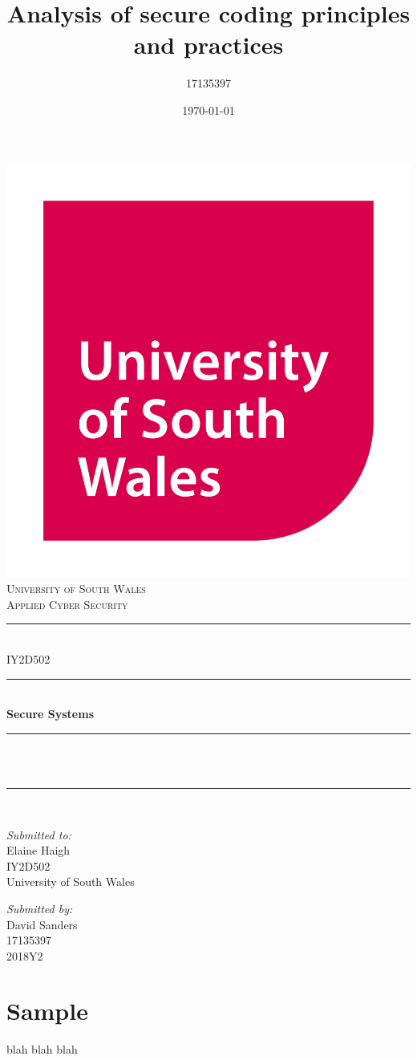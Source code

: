 \documentclass[12pt]{article}
\title{Analysis of secure coding principles and practices}
\author{17135397}
\date{\today}
\makeatletter
\let\thetitle\@title
\makeatother
\begin{document}
\begin{titlepage}
  \centering
  \includegraphics[scale = 0.15]{usw_logo.jpg}\\
  \textsc{\LARGE University of South Wales\\\Large Applied Cyber Security}\\[2cm]

  \rule{\linewidth}{0.2 mm}\\[0.5cm]
  { \huge IY2D502}\\
  \rule{\linewidth}{0.2 mm}\\[0.5cm]
  { \huge \bfseries Secure Systems}\\
  \rule{\linewidth}{0.2 mm}\\[0.5cm]
  \textsc{\Large \thetitle}\\
  \rule{\linewidth}{0.2 mm}\\[4cm]

  \begin{minipage}[t]{0.4\textwidth}
    \begin{flushleft} \large
      \textit{Submitted to:}\\
      Elaine Haigh\\IY2D502\\University of South Wales
    \end{flushleft}
  \end{minipage}
  \begin{minipage}[t]{0.4\textwidth}
    \begin{flushright} \large
      \textit{Submitted by:}\\
      David Sanders\\17135397\\2018Y2
    \end{flushright}
  \end{minipage}
\end{titlepage}



\tableofcontents
\pagebreak



\section{Sample}
blah blah blah
\end{document}
